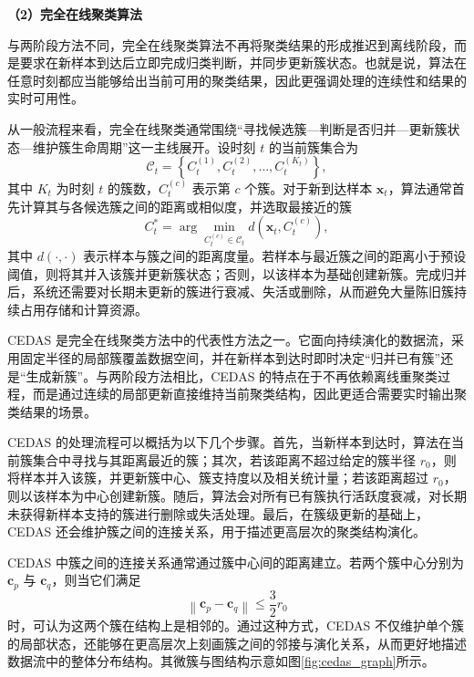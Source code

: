 \documentclass{xdupgthesis}
\begin{document}
\noindent\textbf{（2）完全在线聚类算法}

与两阶段方法不同，完全在线聚类算法不再将聚类结果的形成推迟到离线阶段，而是要求在新样本到达后立即完成归类判断，并同步更新簇状态。也就是说，算法在任意时刻都应当能够给出当前可用的聚类结果，因此更强调处理的连续性和结果的实时可用性。

从一般流程来看，完全在线聚类通常围绕“寻找候选簇—判断是否归并—更新簇状态—维护簇生命周期”这一主线展开。设时刻 $t$ 的当前簇集合为
\begin{equation}
	\mathcal{C}_t
	=
	\left\{
	C_t^{(1)},C_t^{(2)},\ldots,C_t^{(K_t)}
	\right\},
\end{equation}
其中 $K_t$ 为时刻 $t$ 的簇数，$C_t^{(c)}$ 表示第 $c$ 个簇。对于新到达样本 $\mathbf{x}_t$，算法通常首先计算其与各候选簇之间的距离或相似度，并选取最接近的簇
\begin{equation}
	C_t^{\ast}
	=
	\arg\min_{C_t^{(c)}\in \mathcal{C}_t}
	d\!\left(\mathbf{x}_t,C_t^{(c)}\right),
\end{equation}
其中 $d(\cdot,\cdot)$ 表示样本与簇之间的距离度量。若样本与最近簇之间的距离小于预设阈值，则将其并入该簇并更新簇状态；否则，以该样本为基础创建新簇。完成归并后，系统还需要对长期未更新的簇进行衰减、失活或删除，从而避免大量陈旧簇持续占用存储和计算资源。

CEDAS 是完全在线聚类方法中的代表性方法之一。它面向持续演化的数据流，采用固定半径的局部簇覆盖数据空间，并在新样本到达时即时决定“归并已有簇”还是“生成新簇”。与两阶段方法相比，CEDAS 的特点在于不再依赖离线重聚类过程，而是通过连续的局部更新直接维持当前聚类结构，因此更适合需要实时输出聚类结果的场景。

CEDAS 的处理流程可以概括为以下几个步骤。首先，当新样本到达时，算法在当前簇集合中寻找与其距离最近的簇；其次，若该距离不超过给定的簇半径 $r_0$，则将样本并入该簇，并更新簇中心、簇支持度以及相关统计量；若该距离超过 $r_0$，则以该样本为中心创建新簇。随后，算法会对所有已有簇执行活跃度衰减，对长期未获得新样本支持的簇进行删除或失活处理。最后，在簇级更新的基础上，CEDAS 还会维护簇之间的连接关系，用于描述更高层次的聚类结构演化。

CEDAS 中簇之间的连接关系通常通过簇中心间的距离建立。若两个簇中心分别为 $\mathbf{c}_p$ 与 $\mathbf{c}_q$，则当它们满足
\begin{equation}
	\left\|
	\mathbf{c}_p-\mathbf{c}_q
	\right\|
	\le
	\frac{3}{2}r_0
\end{equation}
时，可认为这两个簇在结构上是相邻的。通过这种方式，CEDAS 不仅维护单个簇的局部状态，还能够在更高层次上刻画簇之间的邻接与演化关系，从而更好地描述数据流中的整体分布结构。其微簇与图结构示意如图\ref{fig:cedas_graph}所示。
\end{document}
